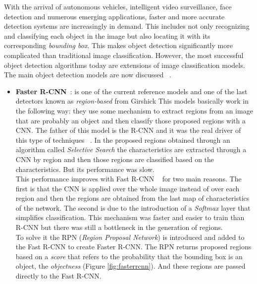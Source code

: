 With the arrival of autonomous vehicles, intelligent video surveillance, face detection and numerous emerging applications, faster and more accurate detection systems are increasingly in demand. This includes not only recognizing and classifying each object in the image but also locating it with its corresponding \textit{bounding box}. This makes object detection significantly more complicated than traditional image classification. However, the most successful object detection algorithms today are extensions of image classification models.\\
The main object detection models are now discussed ~\cite{fu2017dssd}.
\begin{itemize}
    \item \textbf{Faster R-CNN}~\cite{ren2015faster}: is one of the current reference models and one of the last detectors known as  \textit{region-based} from Girshick \etal{}This models basically work in the following way: they use some mechanism to extract regions from an image that are probably an object and then classify those proposed regions with a CNN. The father of this model is the R-CNN and it was the real driver of this type of techniques ~\cite{girshick2014rich}. In the proposed regions obtained through an algorithm called \textit{Selective Search} the characteristics are extracted through a CNN by region and then those regions are classified based on the characteristics. But its performance was slow.\\
    This performance improves with Fast R-CNN ~\cite{girshick2015fast} for two main reasons. The first is that the CNN is applied over the whole image instead of over each region and then the regions are obtained from the last map of characteristics of the network. The second is due to the introduction of a \textit{Softmax} layer that simplifies classification. This mechanism was faster and easier to train than R-CNN but there was still a bottleneck in the generation of regions.\\
    To solve it the RPN (\textit{Region Proposal Network}) is introduced and added to the Fast R-CNN to create Faster R-CNN. The RPN returns proposed regions based on a \textit{score} that refers to the probability that the bounding box is an object, the \textit{objectness} (Figure \ref{fig:fasterrcnn}). And these regions are passed directly to the Fast R-CNN.\\
    \begin{figure}[H]
    \begin{center}

\end{center}
\end{figure}
\end{itemize}
